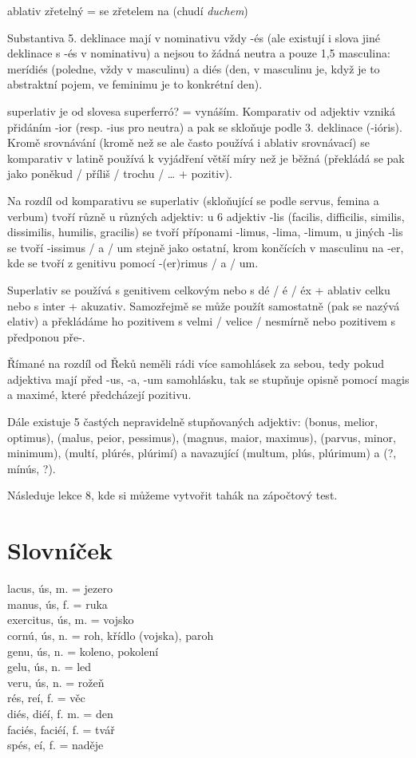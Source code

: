 \documentclass[12pt]{article}					%
\begin{document}
ablativ zřetelný = se zřetelem na (chudí \emph{duchem})

Substantiva 5. deklinace mají v nominativu vždy -és (ale existují i slova jiné deklinace s -és v nominativu) a nejsou to žádná neutra a pouze 1,5 masculina: merídiés (poledne, vždy v masculinu) a diés (den, v masculinu je, když je to abstraktní pojem, ve feminimu je to konkrétní den).

superlativ je od slovesa superferró? = vynáším. Komparativ od adjektiv vzniká přidáním -ior (resp. -ius pro neutra) a pak se skloňuje podle 3. deklinace (-ióris). Kromě srovnávání (kromě než se ale často používá i ablativ srovnávací) se komparativ v latině používá k vyjádření větší míry než je běžná (překládá se pak jako poněkud / příliš / trochu / … + pozitiv).

Na rozdíl od komparativu se superlativ (skloňující se podle servus, femina a verbum) tvoří různě u různých adjektiv: u 6 adjektiv -lis (facilis, difficilis, similis, dissimilis, humilis, gracilis) se tvoří příponami -limus, -lima, -limum, u jiných -lis se tvoří -issimus / a / um stejně jako ostatní, krom končících v masculinu na -er, kde se tvoří z genitivu pomocí -(er)rimus / a / um.

Superlativ se používá s genitivem celkovým nebo s dé / é / éx + ablativ celku nebo s inter + akuzativ. Samozřejmě se může použít samostatně (pak se nazývá elativ) a překládáme ho pozitivem s velmi / velice / nesmírně nebo pozitivem s předponou pře-.

Římané na rozdíl od Řeků neměli rádi více samohlásek za sebou, tedy pokud adjektiva mají před -us, -a, -um samohlásku, tak se stupňuje opisně pomocí magis a maximé, které předcházejí pozitivu.

Dále existuje 5 častých nepravidelně stupňovaných adjektiv: (bonus, melior, optimus), (malus, peior, pessimus), (magnus, maior, maximus), (parvus, minor, minimum), (multí, plúrés, plúrimí) a navazující (multum, plús, plúrimum) a (?, mínús, ?).

Následuje lekce 8, kde si můžeme vytvořit tahák na zápočtový test.
    
\newpage
\section{Slovníček}
    lacus, ús, m. = jezero\\
    manus, ús, f. = ruka\\
    exercitus, ús, m. = vojsko\\
    cornú, ús, n. = roh, křídlo (vojska), paroh\\
    genu, ús, n. = koleno, pokolení\\
    gelu, ús, n. = led\\
    veru, ús, n. = rožeň\\
    rés, reí, f. = věc\\
    diés, diéí, f. m. = den\\
    faciés, faciéí, f. = tvář\\
    spés, eí, f. = naděje\\

    

    
\end{document}
